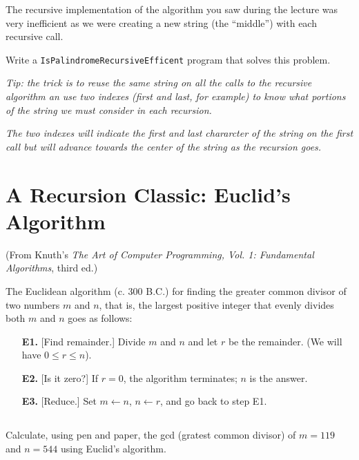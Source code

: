 \documentclass[a4paper, 11pt]{article}
\begin{document}
The recursive implementation of the algorithm you saw during the lecture was
very inefficient as we were creating a new string (the ``middle'') with each
recursive call.

Write a \texttt{IsPalindromeRecursiveEfficent} program that solves this
problem.

\textsl{Tip: the trick is to reuse the same string on all the calls to the
  recursive algorithm an use two indexes (first and last, for example) to know
what portions of the string we must consider in each recursion.}

\textsl{The two indexes will indicate the first and last chararcter of the
string on the first call but will advance towards the center of the string as
the recursion goes.}



\section{A Recursion Classic: Euclid's Algorithm}

(From Knuth's \textsl{The Art of Computer Programming, Vol. 1: Fundamental
Algorithms}, third ed.)

The Euclidean algorithm (c. 300 B.C.) for finding the greater common divisor of
two numbers $m$ and $n$, that is, the largest positive integer that evenly
divides both $m$ and $n$ goes as follows:

\begin{itemize}

  \item[\textbf{E1.}] [Find remainder.] Divide $m$ and $n$ and let $r$ be the remainder. (We will have $0 \le r \le n$).

  \item[\textbf{E2.}] [Is it zero?] If $r = 0$, the algorithm terminates; $n$ is the answer.

  \item[\textbf{E3.}] [Reduce.] Set $m \leftarrow n$, $n \leftarrow r$, and go back to step E1.

\end{itemize}

\subsection{}

Calculate, using pen and paper, the gcd (gratest common divisor) of $m = 119$
and $n = 544$ using Euclid's algorithm.
\end{document}
